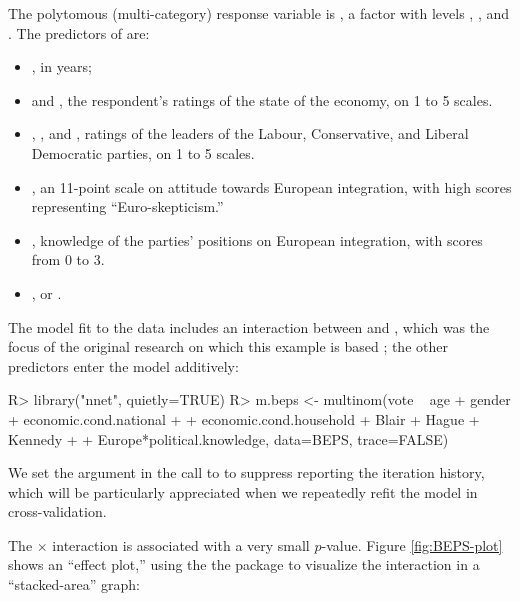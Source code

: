 \documentclass[
]{jss}
\providecommand{\tightlist}{%
  \setlength{\itemsep}{0pt}\setlength{\parskip}{0pt}}
\begin{document}
The polytomous (multi-category) response variable is , a
factor with levels , , and
. The predictors of  are:

\begin{itemize}
\tightlist
\item
  , in years;
\item
   and , the
  respondent's ratings of the state of the economy, on 1 to 5 scales.
\item
  , , and , ratings of the leaders
  of the Labour, Conservative, and Liberal Democratic parties, on 1 to 5
  scales.
\item
  , an 11-point scale on attitude towards European
  integration, with high scores representing ``Euro-skepticism.''
\item
  , knowledge of the parties' positions on
  European integration, with scores from 0 to 3.
\item
  ,  or .
\end{itemize}

The model fit to the data includes an interaction between 
and , which was the focus of the original
research on which this example is based
\citep{AndersenHeathSinnott:2002}; the other predictors enter the model
additively:

\begin{CodeChunk}
\begin{CodeInput}
R> library("nnet", quietly=TRUE)
R> m.beps <- multinom(vote ~ age + gender + economic.cond.national +
+                        economic.cond.household + Blair + Hague + Kennedy +
+                        Europe*political.knowledge, data=BEPS, trace=FALSE)
\end{CodeInput}
\end{CodeChunk}

We set the argument  in the call to 
to suppress reporting the iteration history, which will be particularly
appreciated when we repeatedly refit the model in cross-validation.

The  \(\times\)  interaction is
associated with a very small \(p\)-value. Figure \ref{fig:BEPS-plot}
shows an ``effect plot,'' using the the  package
\citep{FoxWeisberg:2019} to visualize the interaction in a
``stacked-area'' graph:
\end{document}
